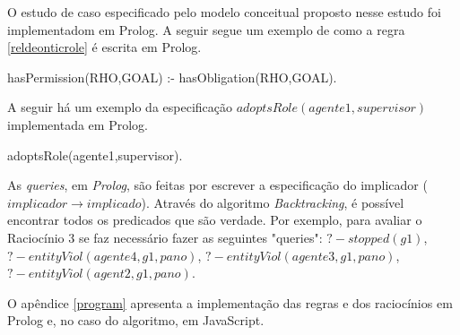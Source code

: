 O estudo de caso especificado pelo modelo conceitual proposto nesse estudo foi implementadom em Prolog. A seguir segue um exemplo de como a regra \ref{reldeonticrole} é escrita em Prolog.

hasPermission(RHO,GOAL) :- hasObligation(RHO,GOAL).

A seguir há um exemplo da especificação $adoptsRole(agente1,supervisor)$ implementada em Prolog.

adoptsRole(agente1,supervisor).

As \textit{queries}, em \textit{Prolog}, são feitas por escrever a especificação do implicador ($implicador \to implicado$). Através do algoritmo \textit{Backtracking}, é possível encontrar todos os predicados que são verdade. Por exemplo, para avaliar o Raciocínio 3 se faz necessário fazer as seguintes "queries": $? - stopped(g1)$, $? - entityViol(agente4,g1,pano)$, $? - entityViol(agente3,g1,pano)$, $? - entityViol(agent2,g1,pano)$. 

O apêndice \ref{program} apresenta a implementação das regras e dos raciocínios em Prolog e, no caso do algoritmo, em JavaScript.
